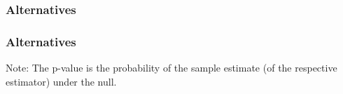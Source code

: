 \documentclass[xcolor={table}]{beamer}
\begin{document}
\begin{frame}\frametitle{Alternatives}
\end{frame}


\begin{frame}\frametitle{Alternatives}
  \begin{alertblock}{Note:}
    The p-value is the probability of the sample estimate (of the respective estimator) under the null.
  \end{alertblock}
\end{frame}
\end{document}
